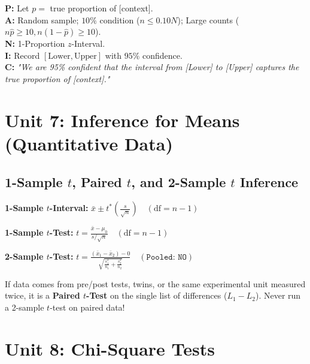 \documentclass[11pt,oneside,openany]{book}
\begin{document}
\begin{templatebox}
\textbf{P:} Let $p =$ true proportion of [context].\\
\textbf{A:} Random sample; $10\%$ condition ($n \le 0.10N$); Large counts ($n\hat{p} \ge 10, n(1-\hat{p}) \ge 10$).\\
\textbf{N:} 1-Proportion $z$-Interval.\\
\textbf{I:} Record $[ \text{Lower}, \text{Upper} ]$ with $95\%$ confidence.\\
\textbf{C:} \emph{"We are 95\% confident that the interval from [Lower] to [Upper] captures the true proportion of [context]."}
\end{templatebox}

\chapter{Unit 7: Inference for Means (Quantitative Data)}

\section{1-Sample $t$, Paired $t$, and 2-Sample $t$ Inference}
\begin{formulabox}
\textbf{1-Sample $t$-Interval:} $\bar{x} \pm t^* \left(\frac{s}{\sqrt{n}}\right) \quad (\text{df} = n - 1)$

\textbf{1-Sample $t$-Test:} $t = \frac{\bar{x} - \mu_0}{s / \sqrt{n}} \quad (\text{df} = n - 1)$

\textbf{2-Sample $t$-Test:} $t = \frac{(\bar{x}_1 - \bar{x}_2) - 0}{\sqrt{\frac{s_1^2}{n_1} + \frac{s_2^2}{n_2}}} \quad (\texttt{Pooled: NO})$
\end{formulabox}

\begin{trapbox}
If data comes from pre/post tests, twins, or the same experimental unit measured twice, it is a \textbf{Paired $t$-Test} on the single list of differences ($L_1 - L_2$). Never run a 2-sample $t$-test on paired data!
\end{trapbox}

\chapter{Unit 8: Chi-Square Tests}
\end{document}
